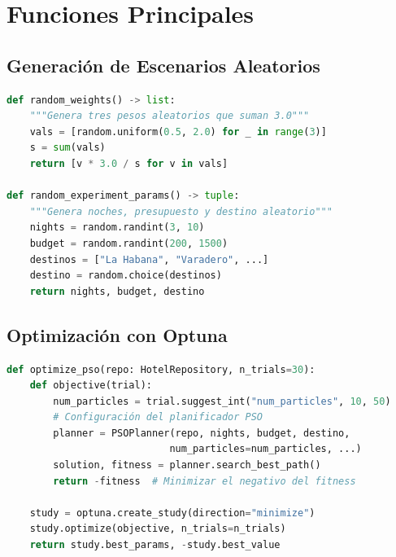 \documentclass{article}
\begin{document}
\section{Funciones Principales}

\subsection{Generación de Escenarios Aleatorios}
\begin{lstlisting}[language=Python, caption=Generación de parámetros aleatorios]
def random_weights() -> list:
    """Genera tres pesos aleatorios que suman 3.0"""
    vals = [random.uniform(0.5, 2.0) for _ in range(3)]
    s = sum(vals)
    return [v * 3.0 / s for v in vals]

def random_experiment_params() -> tuple:
    """Genera noches, presupuesto y destino aleatorio"""
    nights = random.randint(3, 10)
    budget = random.randint(200, 1500)
    destinos = ["La Habana", "Varadero", ...]
    destino = random.choice(destinos)
    return nights, budget, destino
\end{lstlisting}

\subsection{Optimización con Optuna}
\begin{lstlisting}[language=Python, caption=Optimización de parámetros para PSO]
def optimize_pso(repo: HotelRepository, n_trials=30):
    def objective(trial):
        num_particles = trial.suggest_int("num_particles", 10, 50)
        # Configuración del planificador PSO
        planner = PSOPlanner(repo, nights, budget, destino, 
                            num_particles=num_particles, ...)
        solution, fitness = planner.search_best_path()
        return -fitness  # Minimizar el negativo del fitness
        
    study = optuna.create_study(direction="minimize")
    study.optimize(objective, n_trials=n_trials)
    return study.best_params, -study.best_value
\end{lstlisting}
\end{document}

